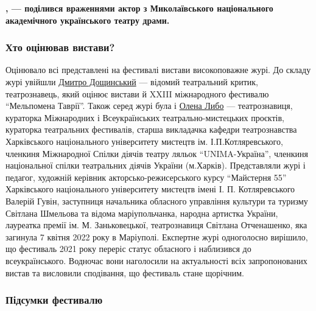 \begin{leftbar}
	\begingroup
		\bfseries
{}, — поділився враженнями актор з
Миколаївського національного академічного українського театру драми.
	\endgroup
\end{leftbar}

\subsubsection{Хто оцінював вистави?}


Оцінювало всі представлені на фестивалі вистави високоповажне журі. До складу
журі увійшли \href{https://www.facebook.com/profile.php?id=100000612002046}{Дмитро Дощинський} — відомий театральний критик, театрознавець,
який оцінює вистави й XXIII міжнародного фестивалю \enquote{Мельпомена Таврії}. Також
серед журі була і \href{https://www.facebook.com/helena.libo}{Олена Либо} — театрознавиця, кураторка Міжнародних і
Всеукраїнських театрально-мистецьких проєктів, кураторка театральних
фестивалів, старша викладачка кафедри театрознавства Харківського національного
університету мистецтв ім. І.П.Котляревського, членкиня Міжнародної Спілки
діячів театру ляльок \enquote{UNIMA-Україна}, членкиня національної спілки театральних
діячів України (м.Харків). Представляли журі і педагог, художній керівник
акторсько-режисерського курсу \enquote{Майстерня 55} Харківського національного
університету мистецтв імені І. П. Котляревського Валерій Гувін, заступниця
начальника обласного управління культури та туризму Світлана Шмельова та відома
маріупольчанка, народна артистка України, лауреатка премії ім. М.
Заньковецької, театрознавиця Світлана Отченашенко, яка загинула 7 квітня 2022
року в Маріуполі. Експертне журі одноголосно вирішило, що фестиваль 2021 року
переріс статус обласного і наблизився до всеукраїнського. Водночас вони
наголосили на актуальності всіх запропонованих вистав та висловили сподівання,
що фестиваль стане щорічним. 

\subsubsection{Підсумки фестивалю}

